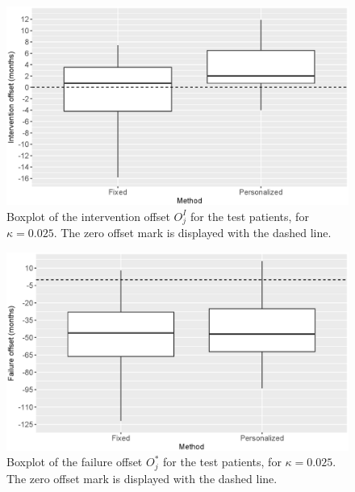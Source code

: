 \begin{figure}[!htb]
\centerline{\includegraphics[width=\columnwidth]{images/truethrestimept025.eps}}
\caption{Boxplot of the intervention offset $O^I_j$ for the test patients, for $\kappa = 0.025$. The zero offset mark is displayed with the dashed line.}
\label{fig : truethrestimept025}
\end{figure}

\begin{figure}[!htb]
\centerline{\includegraphics[width=\columnwidth]{images/truestoptimept025.eps}}
\caption{Boxplot of the failure offset $O^*_j$ for the test patients, for $\kappa = 0.025$. The zero offset mark is displayed with the dashed line.}
\label{fig : truestoptimept025}
\end{figure}